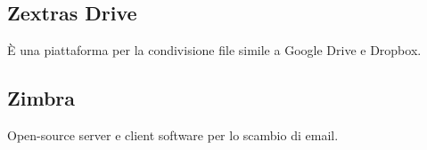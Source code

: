 \subsection{Zextras Drive} È una piattaforma per la condivisione file simile a Google Drive e Dropbox.
\subsection{Zimbra} Open-source server e client software per lo scambio di email.